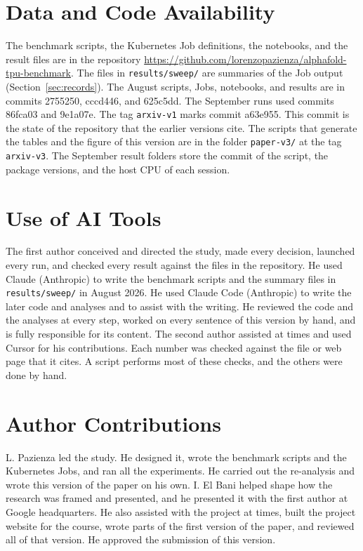 \section*{Data and Code Availability}
The benchmark scripts, the Kubernetes Job definitions, the notebooks, and the result files are in the repository
\url{https://github.com/lorenzopazienza/alphafold-tpu-benchmark}. The files in \texttt{results/sweep/} are summaries of the Job
output (Section~\ref{sec:records}).
The August scripts, Jobs, notebooks, and results are in commits 2755250, cccd446, and 625c5dd. %
The September runs used commits 86fca03 and 9e1a07e. The tag \texttt{arxiv-v1} marks commit a63e955. This commit is the state of
the repository that the earlier versions cite. %
The scripts that generate the tables and the figure of this version are in the folder \texttt{paper-v3/} at the tag
\texttt{arxiv-v3}. The September result folders store the commit of the script, the package versions, and the host CPU
of each session.

\section*{Use of AI Tools}
The first author conceived and directed the study, made every decision, launched every run, and checked every
result against the files in the repository.
He used Claude (Anthropic) to write the benchmark scripts and the summary files in \texttt{results/sweep/} in August
2026. He used Claude Code (Anthropic) to write the later code and analyses and to assist with the writing. %
He reviewed the code and the analyses at every step, worked on every sentence of this version by hand, and is fully
responsible for its content. The second author assisted at times and used Cursor for his contributions. Each number was
checked against the file or web page that it cites. A script performs most of these checks, and the others were done by
hand.

\section*{Author Contributions}
L. Pazienza led the study. He designed it, wrote the benchmark scripts and the Kubernetes Jobs, and ran all the
experiments. He carried out the re-analysis and wrote this version of the paper on his own. I. El Bani helped shape how
the research was framed and presented, and he presented it with the first author at Google headquarters. He also
assisted with the project at times, built the project website for the course, wrote parts of the first version of the
paper, and reviewed all of that version. He approved the submission of this version.

